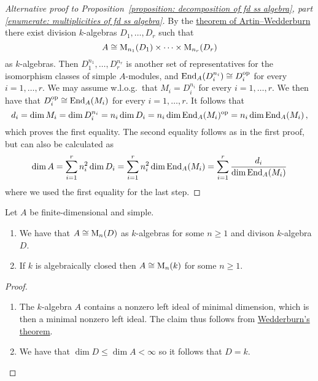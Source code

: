 \begin{proof}[Alternative proof to Proposition~\ref*{proposition: decomposition of fd ss algebra}, part \ref*{enumerate: multiplicities of fd ss algebra}]
  By the \hyperref[theorem: artin wedderburn theorem]{theorem of Artin--Wedderburn} there exist division $k$-algebras $D_1, \dotsc, D_r$ such that
  \[
          A
    \cong \operatorname{M}_{n_1}(D_1) \times \dotsb \times \operatorname{M}_{n_r}(D_r)
  \]
  as $k$-algebras.
  Then $D_1^{n_1}, \dotsc, D_r^{n_r}$ is another set of representatives for the isomorphism classes of simple $A$-modules, and $\operatorname{End}_A(D_i^{n_i}) \cong D_i^{\mathrm{op}}$ for every $i = 1, \dotsc, r$.
  We may assume w.l.o.g.\ that $M_i = D_i^{n_i}$ for every $i = 1, \dotsc, r$.
  We then have that $D_i^{\mathrm{op}} \cong \operatorname{End}_A(M_i)$ for every $i = 1, \dotsc, r$.
  It follows that
  \[
      d_i
    = \dim M_i
    = \dim D_i^{n_i}
    = n_i \dim D_i
    = n_i \dim \operatorname{End}_A(M_i)^{\mathrm{op}}
    = n_i \dim \operatorname{End}_A(M_i) \,,
  \]
  which proves the first equality.
  The second equality follows as in the first proof, but can also be calculated as
  \[
      \dim A
    = \sum_{i=1}^r n_i^2 \dim D_i
    = \sum_{i=1}^r n_i^2 \dim \operatorname{End}_A(M_i)
    = \sum_{i=1}^r \frac{d_i}{\dim \operatorname{End}_A(M_i)}
  \]
  where we used the first equality for the last step.
\end{proof}


\begin{corollary}[Wedderburn]
  \label{corollary: wedderburn for algebras}
  Let $A$ be finite-dimensional and simple.
  \begin{enumerate}
    \item
      We have that $A \cong \operatorname{M}_n(D)$ as $k$-algebras for some $n \geq 1$ and divison $k$-algebra $D$.
    \item
      If $k$ is algebraically closed then $A \cong \operatorname{M}_n(k)$ for some $n \geq 1$.
  \end{enumerate}
\end{corollary}


\begin{proof}
  \leavevmode
  \begin{enumerate}
    \item
      The $k$-algebra $A$ contains a nonzero left ideal of minimal dimension, which is then a minimal nonzero left ideal.
      The claim thus follows from \hyperref[theorem: wedderburns theorem]{Wedderburn’s theorem}.
    \item
      We have that $\dim D \leq \dim A < \infty$ so it follows that $D = k$.
    \qedhere
  \end{enumerate}
\end{proof}





